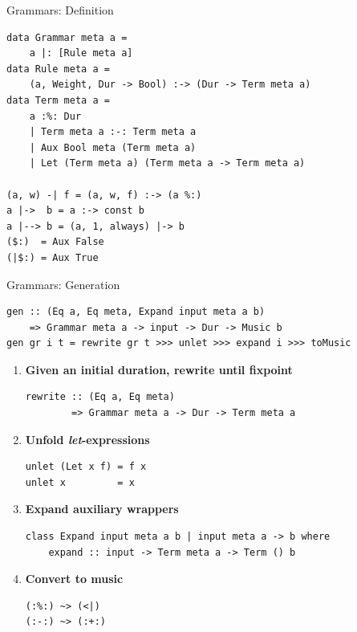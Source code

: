 \documentclass{beamer}
\begin{document}
	\begin{frame}[fragile=singleslide]{Grammars: Definition}
	\begin{verbatim}
data Grammar meta a =
    a |: [Rule meta a]
data Rule meta a =
    (a, Weight, Dur -> Bool) :-> (Dur -> Term meta a)
data Term meta a =
    a :%: Dur
    | Term meta a :-: Term meta a
    | Aux Bool meta (Term meta a)
    | Let (Term meta a) (Term meta a -> Term meta a)

(a, w) -| f = (a, w, f) :-> (a %:)
a |->  b = a :-> const b
a |--> b = (a, 1, always) |-> b
($:)  = Aux False
(|$:) = Aux True
	\end{verbatim}
	\end{frame}
	
	\begin{frame}[fragile=singleslide]{Grammars: Generation}

    	\begin{verbatim}
gen :: (Eq a, Eq meta, Expand input meta a b)
    => Grammar meta a -> input -> Dur -> Music b
gen gr i t = rewrite gr t >>> unlet >>> expand i >>> toMusic
	\end{verbatim}


	\begin{enumerate}	
	
	\item \textbf{Given an initial duration, rewrite until fixpoint}
	\begin{verbatim}
rewrite :: (Eq a, Eq meta)
        => Grammar meta a -> Dur -> Term meta a
	\end{verbatim}
	
	\item \textbf{Unfold \textit{let}-expressions}
	\begin{verbatim}
unlet (Let x f) = f x
unlet x         = x
	\end{verbatim}
	
	\item \textbf{Expand auxiliary wrappers}
	\begin{verbatim}
class Expand input meta a b | input meta a -> b where
    expand :: input -> Term meta a -> Term () b
	\end{verbatim}
	
	\item \textbf{Convert to music}
	\begin{verbatim}
(:%:) ~> (<|)
(:-:) ~> (:+:)
	\end{verbatim}
		
	\end{enumerate}
	\end{frame}	
	
\end{document}
